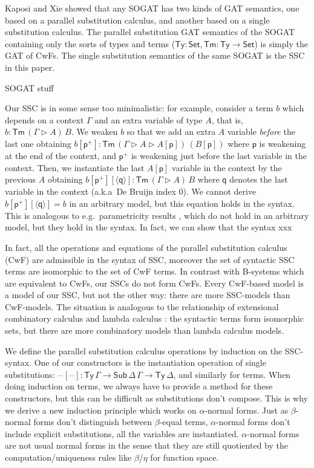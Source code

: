 \documentclass[sigplan,10pt,anonymous,review]{acmart}\settopmatter{printfolios=true,printccs=false,printacmref=false}
\newcommand{\ra}{\rightarrow}
\newcommand{\Set}{\mathsf{Set}}
\newcommand{\Ty}{\mathsf{Ty}}
\newcommand{\Tm}{\mathsf{Tm}}
\newcommand{\Sub}{\mathsf{Sub}}
\newcommand{\p}{\mathsf{p}}
\newcommand{\q}{\mathsf{q}}
\newcommand{\ext}{\mathop{\triangleright}}
\newcommand{\blank}{\mathord{\hspace{1pt}\text{--}\hspace{1pt}}} %
\begin{document}
Kaposi and Xie \cite{DBLP:conf/fscd/KaposiX24} showed that any SOGAT
has two kinds of GAT semantics, one based on a parallel substitution
calculus, and another based on a single substitution calculus. The
parallel substitution GAT semantics of the SOGAT containing only the
sorts of types and terms ($\Ty : \Set, \Tm : \Ty\ra\Set$) is simply
the GAT of CwFs. The single substitution semantics of the same SOGAT
is the SSC in this paper. 

SOGAT stuff

Our SSC is in some sense too minimalistic: for example, consider a
term $b$ which depends on a context $\Gamma$ and an extra variable of
type $A$, that is, $b : \Tm\,(\Gamma\ext A)\,B$. We weaken $b$ so
that we add an extra $A$ variable \emph{before} the last one obtaining
$
b[\p^+] : \Tm\,(\Gamma\ext A\ext A[\p])\,(B[\p])
$
where $\p$ is
weakening at the end of the context, and $\p^+$ is weakening just
before the last variable in the context. Then, we instantiate the last
$A[\p]$ variable in the context by the previous $A$ obtaining
$b[\p^+][\langle\q\rangle] : \Tm\,(\Gamma\ext A)\,B$ where $\q$ denotes the last
variable in the context (a.k.a\ De Bruijn index $0$).
We cannot derive $b[\p^+][\langle\q\rangle] = b$ in
an arbitrary model, but this equation holds in the syntax.
This is analogous to e.g.\ parametricity results
\cite{DBLP:journals/jfp/BernardyJP12}, which do not hold in an
arbitrary model, but they hold in the syntax. In fact, we can show
that the syntax xxx

In fact, all the
operations and equations of the parallel substitution calculus (CwF)
are admissible in the syntax of SSC, moreover the set of syntactic SSC
terms are isomorphic to the set of CwF terms. In contrast with
B-systems which are equivalent to CwFs, our SSCs do not form
CwFs. Every CwF-based model is a model of our SSC, but not the other
way: there are more SSC-models than CwF-models. The situation is
analogous to the relationship of extensional combinatory calculus and
lambda calculus \cite{DBLP:conf/fscd/AltenkirchKSV23}: the syntactic
terms form isomorphic sets, but there are more combinatory models than
lambda calculus models.

We define the parallel substitution calculus operations by induction
on the SSC-syntax. One of our constructors is the instantiation
operation of single substitutions: $\blank[\blank] :
\Ty\,\Gamma\ra\Sub\,\Delta\,\Gamma\ra\Ty\,\Delta$, and similarly for
terms. When doing induction on terms, we always have to provide a
method for these constructors, but this can be difficult as
substitutions don't compose. This is why we derive a new induction
principle which works on $\alpha$-normal forms. Just as $\beta$-normal
forms don't distinguish between $\beta$-equal terms, $\alpha$-normal
forms don't include explicit substitutions, all the variables are
instantiated. $\alpha$-normal forms are not usual normal forms in the
sense that they are still quotiented by the computation/uniqueness
rules like $\beta$/$\eta$ for function space.
\end{document}
